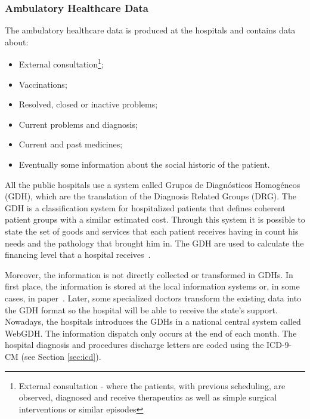 
\subsubsection{Ambulatory Healthcare Data}

The ambulatory healthcare data is produced at the hospitals and contains data about:
\begin{itemize}
\item External consultation\footnote{External consultation - where the patients, with previous scheduling, are observed, diagnosed and receive therapeutics as well as simple surgical interventions or similar episodes};
\item Vaccinations;
\item Resolved, closed or inactive problems;
\item Current problems and diagnosis;
\item Current and past medicines;
\item Eventually some information about the social historic of the patient.
\end{itemize}

All the public hospitals use a system called Grupos de Diagnósticos Homogéneos (GDH), which are the translation of the  Diagnosis Related Groups (DRG). The GDH is a classification system for hospitalized patients that defines coherent patient groups with a similar estimated cost. Through this system it is possible to state the set of goods and services that each patient receives having in count his needs and the pathology that brought him in. The GDH are used to calculate the financing level that a hospital receives~\citep{GDH2011}.

Moreover, the information is not directly collected or transformed in GDHs. In first place, the information is stored at the local information systems or, in some cases, in paper~\citep{Ferreira2008}. Later, some specialized doctors transform the existing data into the GDH format so the hospital will be able to receive the state's support. Nowadays, the hospitals introduces the GDHs in a national central system called WebGDH. The information dispatch only occurs at the end of each month. The hospital diagnosis and procedures discharge letters are coded using the ICD-9-CM (see Section \ref{sec:icd}).


